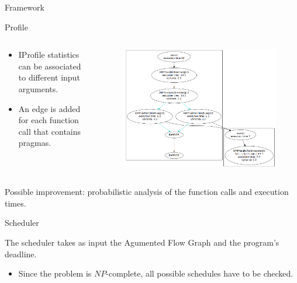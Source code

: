 \documentclass[xcolor=dvipsnames]{beamer}
\begin{document}
\begin{section}{Framework}
\begin{frame}{\hskip 0.3cm Profile}
\begin{columns}
\begin{column}{5cm}
\begin{itemize}
\item IProfile statistics can be associated to different input arguments.

\item An edge is added for each function call that contains pragmas.

\end{itemize}
\end{column}

\begin{column}{7.5cm}
\vskip -0.5cm
\begin{figure}
\centering
\includegraphics[scale=0.22]{call_graph.png}

\end{figure}
\end{column}

\end{columns}

Possible improvement: probabilistic analysis of the function calls and execution times.


\end{frame}








\begin{frame}{\hskip 0.3cm Scheduler }

The scheduler takes as input the Agumented Flow Graph and the program's deadline.

\begin{itemize}

\item Since the problem is $NP$-complete, all possible schedules have to be checked.


\end{itemize}
\end{frame}
\end{section}
\end{document}
